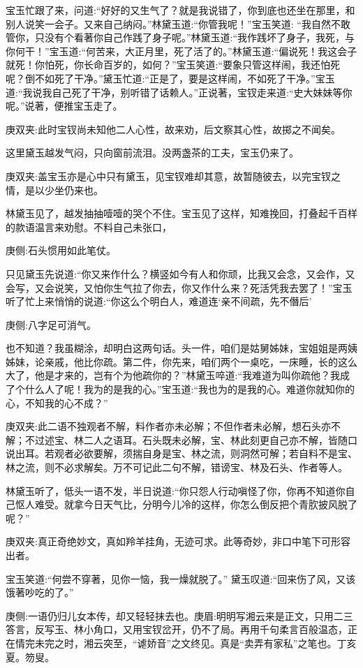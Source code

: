 \begin{parag}
    宝玉忙跟了来，问道:“好好的又生气了？就是我说错了，你到底也还坐在那里，和别人说笑一会子。又来自己纳闷。”林黛玉道:“你管我呢！”宝玉笑道: “我自然不敢管你，只没有个看著你自己作践了身子呢。”林黛玉道:“我作践坏了身子，我死，与你何干！”宝玉道:“何苦来，大正月里，死了活了的。”林黛玉道:“偏说死！我这会子就死！你怕死，你长命百岁的，如何？”宝玉笑道:“要象只管这样闹，我还怕死呢？倒不如死了干净。”黛玉忙道:“正是了，要是这样闹，不如死了干净。”宝玉道:“我说我自己死了干净，别听错了话赖人。”正说著，宝钗走来道:“史大妹妹等你呢。”说著，便推宝玉走了。\begin{note}庚双夹:此时宝钗尚未知他二人心性，故来劝，后文察其心性，故掷之不闻矣。\end{note}这里黛玉越发气闷，只向窗前流泪。没两盏茶的工夫，宝玉仍来了。\begin{note}庚双夹:盖宝玉亦是心中只有黛玉，见宝钗难却其意，故暂随彼去，以完宝钗之情，是以少坐仍来也。\end{note}林黛玉见了，越发抽抽噎噎的哭个不住。宝玉见了这样，知难挽回，打叠起千百样的款语温言来劝慰。不料自己未张口，\begin{note}庚侧:石头惯用如此笔仗。\end{note}只见黛玉先说道:“你又来作什么？横竖如今有人和你顽，比我又会念，又会作，又会写，又会说笑，又怕你生气拉了你去，你又作什么来？死活凭我去罢了！”宝玉听了忙上来悄悄的说道:“你这么个明白人，难道连‘亲不间疏，先不僭后’\begin{note}庚侧:八字足可消气。\end{note}也不知道？我虽糊涂，却明白这两句话。头一件，咱们是姑舅姊妹，宝姐姐是两姨姊妹，论亲戚，他比你疏。第二件，你先来，咱们两个一桌吃，一床睡，长的这么大了，他是才来的，岂有个为他疏你的？”林黛玉啐道:“我难道为叫你疏他？我成了个什么人了呢！我为的是我的心。”宝玉道:“我也为的是我的心。难道你就知你的心，不知我的心不成？”\begin{note}庚双夹:此二语不独观者不解，料作者亦未必解；不但作者未必解，想石头亦不解；不过述宝、林二人之语耳。石头既未必解，宝、林此刻更自己亦不解，皆随口说出耳。若观者必欲要解，须揣自身是宝、林之流，则洞然可解；若自料不是宝、林之流，则不必求解矣。万不可记此二句不解，错谤宝、林及石头、作者等人。\end{note}林黛玉听了，低头一语不发，半日说道:“你只怨人行动嗔怪了你，你再不知道你自己怄人难受。就拿今日天气比，分明今儿冷的这样，你怎么倒反把个青肷披风脱了呢？”\begin{note}庚双夹:真正奇绝妙文，真如羚羊挂角，无迹可求。此等奇妙，非口中笔下可形容出者。\end{note}宝玉笑道:“何尝不穿著，见你一恼，我一燥就脱了。” 黛玉叹道:“回来伤了风，又该饿著吵吃的了。”\begin{note}庚侧:一语仍归儿女本传，却又轻轻抹去也。庚眉:明明写湘云来是正文，只用二三答言，反写玉、林小角口，又用宝钗岔开，仍不了局。再用千句柔言百般温态，正在情完未完之时，湘云突至，“谑娇音”之文终见。真是“卖弄有家私”之笔也。丁亥夏。笏叟。\end{note}
\end{parag}


